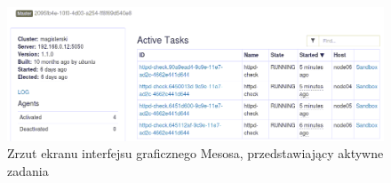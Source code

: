 \documentclass[10pt,a4paper,titlepage,twoside]{report}
\begin{document}
\begin{figure}[!h]
	\centering
	\includegraphics[scale=0.5]{pics/Selection_661.png}
	\caption{Zrzut ekranu interfejsu graficznego Mesosa, przedstawiający aktywne zadania}
	\label{mesos-proof}
\end{figure}

\newpage

\listoffigures
{}

\newpage

\listoftables
{}
\end{document}
